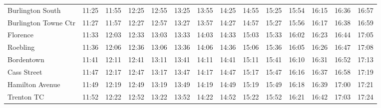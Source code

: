 \begin{center}
\begin{tabular}{@{}lrrrrrrrrrrrrr@{}}
Burlington South & 11:25 & 11:55 & 12:25 & 12:55 & 13:25 & 13:55 & 14:25 & 14:55 & 15:25 & 15:54 & 16:15 & 16:36 & 16:57 \\
Burlington Towne Ctr & 11:27 & 11:57 & 12:27 & 12:57 & 13:27 & 13:57 & 14:27 & 14:57 & 15:27 & 15:56 & 16:17 & 16:38 & 16:59 \\
Florence & 11:33 & 12:03 & 12:33 & 13:03 & 13:33 & 14:03 & 14:33 & 15:03 & 15:33 & 16:02 & 16:23 & 16:44 & 17:05 \\
Roebling & 11:36 & 12:06 & 12:36 & 13:06 & 13:36 & 14:06 & 14:36 & 15:06 & 15:36 & 16:05 & 16:26 & 16:47 & 17:08 \\
Bordentown & 11:41 & 12:11 & 12:41 & 13:11 & 13:41 & 14:11 & 14:41 & 15:11 & 15:41 & 16:10 & 16:31 & 16:52 & 17:13 \\
Cass Street & 11:47 & 12:17 & 12:47 & 13:17 & 13:47 & 14:17 & 14:47 & 15:17 & 15:47 & 16:16 & 16:37 & 16:58 & 17:19 \\
Hamilton Avenue & 11:49 & 12:19 & 12:49 & 13:19 & 13:49 & 14:19 & 14:49 & 15:19 & 15:49 & 16:18 & 16:39 & 17:00 & 17:21 \\
Trenton TC & 11:52 & 12:22 & 12:52 & 13:22 & 13:52 & 14:22 & 14:52 & 15:22 & 15:52 & 16:21 & 16:42 & 17:03 & 17:24 \\
\bottomrule\end{tabular}\end{center}
